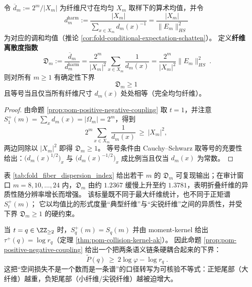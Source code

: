 \begin{corollary}\label{cor:pom-fiber-dispersion-index}
令 \(\overline d_m:=2^m/|X_m|\) 为纤维尺寸在均匀 \(X_m\) 取样下的算术均值，并令
\[
d_m^{\mathrm{harm}}
:=
\frac{|X_m|}{\sum_{x\in X_m} d_m(x)^{-1}}
=
\frac{|X_m|}{\|E_m\|_{HS}^2}
\]
为对应的调和均值（推论 \ref{cor:fold-conditional-expectation-schatten}）。
定义\textbf{纤维离散度指数}
\[
\boxed{\;
\mathfrak{D}_m
:=
\frac{\overline d_m}{d_m^{\mathrm{harm}}}
=
\frac{2^m}{|X_m|^2}\sum_{x\in X_m}\frac{1}{d_m(x)}
=
\frac{2^m}{|X_m|^2}\|E_m\|_{HS}^2\; }.
\]
则对所有 \(m\ge 1\) 有确定性下界
\[
\boxed{\;\mathfrak{D}_m\ge 1\;}
\]
且等号当且仅当所有纤维尺寸 \(d_m(x)\) 处处相等（完全均匀纤维）。
\end{corollary}
\begin{proof}
由命题 \ref{prop:pom-positive-negative-coupling} 取 \(t=1\)，并注意 \(S_1^+(m)=\sum_x d_m(x)=|\Omega_m|=2^m\)，得到
\[
2^m\sum_{x\in X_m}\frac{1}{d_m(x)}\ \ge\ |X_m|^2,
\]
两边同除以 \(|X_m|^2\) 即得 \(\mathfrak{D}_m\ge 1\)。
等号条件由 Cauchy--Schwarz 取等号的充要性给出：\(\bigl(d_m(x)^{1/2}\bigr)_x\) 与 \(\bigl(d_m(x)^{-1/2}\bigr)_x\) 成比例当且仅当 \(d_m(x)\) 为常数。
\end{proof}


\begin{remark}[审计窗口内的异质性趋势]\label{rem:pom-fiber-dispersion-trend}
表 \ref{tab:fold_fiber_dispersion_index} 给出若干 \(m\) 的 \(\mathfrak{D}_m\) 可复现输出；在审计窗口 \(m=8,10,\dots,24\) 内，\(\mathfrak{D}_m\) 由约 \(1.2367\) 缓慢上升至约 \(1.3781\)，表明折叠纤维的异质性随分辨率增长而增强。
该标量既不同于最大纤维统计，也不同于正矩谱 \(S_t^+(m)\)；
它以均值比的形式度量“典型纤维”与“尖锐纤维”之间的异质性，并受下界 \(\mathfrak{D}_m\ge 1\) 的硬约束。
\end{remark}

\begin{remark}\label{rem:pom-negative-pressure-bridge-to-positive}
当 \(t=q\in\ZZ_{\ge 2}\) 时，\(S_q^+(m)=S_q(m)\) 并由 moment-kernel 给出 \(\tau^{+}(q)=\log r_q\)（定理 \ref{thm:pom-collision-kernel-ak}）。
因此命题 \ref{prop:pom-positive-negative-coupling} 给出一个把两条语义链条硬耦合起来的下界：
$$
\boxed{\;
\widetilde P(q)\ \ge\ 2\log\varphi-\log r_q\; }.
$$
这把“空间损失不是一个数而是一条谱”的口径转写为可核验不等式：正矩尾部（大纤维）越重，负矩尾部（小纤维/尖锐纤维）越被迫增大。
\end{remark}

